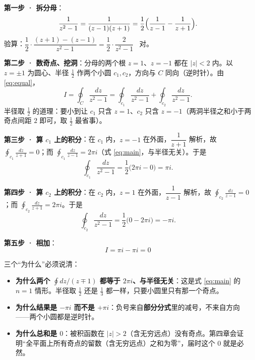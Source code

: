


\qbreak
{}

\textbf{第一步 · 拆分母}：
\[ \frac{1}{z^{2}-1}=\frac{1}{(z-1)(z+1)}=\frac12\Bigl(\frac{1}{z-1}-\frac{1}{z+1}\Bigr) . \]
验算：$\dfrac12\cdot\dfrac{(z+1)-(z-1)}{z^{2}-1}=\dfrac12\cdot\dfrac{2}{z^{2}-1}$ \ 对。

\textbf{第二步 · 数奇点、挖洞}：分母的两个根 $z=1$、$z=-1$ 都在 $|z|<2$ 内。以 $z=\pm1$ 为圆心、半径 $\tfrac12$ 作两个小圆 $c_1,c_2$，方向与 $C$ 同向（逆时针）。由 \eqref{eq:equal}，
\[ I=\oint_C\frac{dz}{z^{2}-1}=\oint_{c_1}\frac{dz}{z^{2}-1}+\oint_{c_2}\frac{dz}{z^{2}-1} . \]
半径取 $\tfrac12$ 的道理：要小到让 $c_1$ 只含 $z=1$、$c_2$ 只含 $z=-1$（两洞半径之和小于两奇点间距 $2$ 即可，取 $\tfrac12$ 最省事）。

\textbf{第三步 · 算 $c_1$ 上的积分}：在 $c_1$ 内，$z=-1$ 在外面，$\dfrac{1}{z+1}$ 解析，故 $\displaystyle\oint_{c_1}\frac{dz}{z+1}=0$；而 $\displaystyle\oint_{c_1}\frac{dz}{z-1}=2\pi i$（式 \eqref{eq:main}，与半径无关）。于是
\[ \oint_{c_1}\frac{dz}{z^{2}-1}=\frac12\bigl(2\pi i-0\bigr)=\pi i . \]

\textbf{第四步 · 算 $c_2$ 上的积分}：在 $c_2$ 内，$z=1$ 在外面，$\dfrac{1}{z-1}$ 解析，故 $\displaystyle\oint_{c_2}\frac{dz}{z-1}=0$；而 $\displaystyle\oint_{c_2}\frac{dz}{z+1}=2\pi i$。于是
\[ \oint_{c_2}\frac{dz}{z^{2}-1}=\frac12\bigl(0-2\pi i\bigr)=-\pi i . \]

\textbf{第五步 · 相加}：
\[ \boxed{\;I=\pi i-\pi i=0\;} \]

三个“为什么”必须说清：

\begin{itemize}
\item[(1)] \textbf{为什么两个 $\oint dz/(z\mp1)$ 都等于 $2\pi i$、与半径无关}：这是式 \eqref{eq:main} 的 $n=1$ 情形。半径取 $\tfrac12$ 还是 $\tfrac13$ 都一样，只要小圆里只有那一个奇点。
\item[(2)] \textbf{为什么结果是 $-\pi i$ 而不是 $+\pi i$}：负号来自\textbf{部分分式}里的减号，不来自方向——两个小圆都是逆时针。
\item[(3)] \textbf{为什么总和是 $0$}：被积函数在 $|z|>2$（含无穷远点）没有奇点。第四章会证明“全平面上所有奇点的留数（含无穷远点）之和为零”，届时这个 $0$ 就是必然。
\end{itemize}

